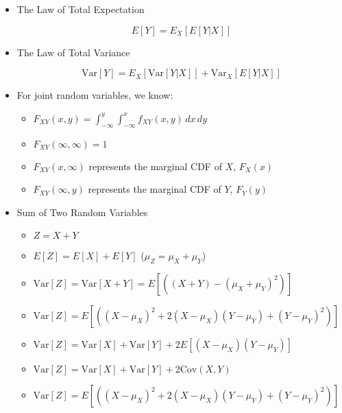 \begin{itemize}

  \item The Law of Total Expectation

    $$E[Y]=E_X[E[Y|X]]$$

  \item The Law of Total Variance

    $$\text{Var}[Y]=E_X[\text{Var}[Y|X]]+\text{Var}_X[E[Y|X]]$$

  \item For joint random variables, we know:

    \begin{itemize}

      \item $F_{XY}(x,y)=\displaystyle \int_{-\infty}^y\int_{-\infty}^x f_{XY}(x,y)\,dx\,dy$

      \item $F_{XY}(\infty,\infty)=1$

      \item $F_{XY}(x,\infty)$ represents the marginal CDF of $X$, $F_X(x)$

      \item $F_{XY}(\infty,y)$ represents the marginal CDF of $Y$, $F_Y(y)$

    \end{itemize}

  \item Sum of Two Random Variables

    \begin{itemize}

      \item $Z=X+Y$

      \item $E[Z]=E[X]+E[Y]$ ($\mu_Z=\mu_X+\mu_Y$)

      \item $\text{Var}[Z]=\text{Var}[X+Y]=E[((X+Y)-(\mu_X+\mu_Y)^2)]$

      \item $\text{Var}[Z]=E[((X-\mu_X)^2+2(X-\mu_X)(Y-\mu_Y)+(Y-\mu_Y)^2)]$

      \item $\text{Var}[Z]=\text{Var}[X]+\text{Var}[Y]+2E[(X-\mu_X)(Y-\mu_Y)]$

      \item $\text{Var}[Z]=\text{Var}[X]+\text{Var}[Y]+2\text{Cov}(X,Y)$

      \item $\text{Var}[Z]=E[((X-\mu_X)^2+2(X-\mu_X)(Y-\mu_Y)+(Y-\mu_Y)^2)]$


\end{itemize}
\end{itemize}
